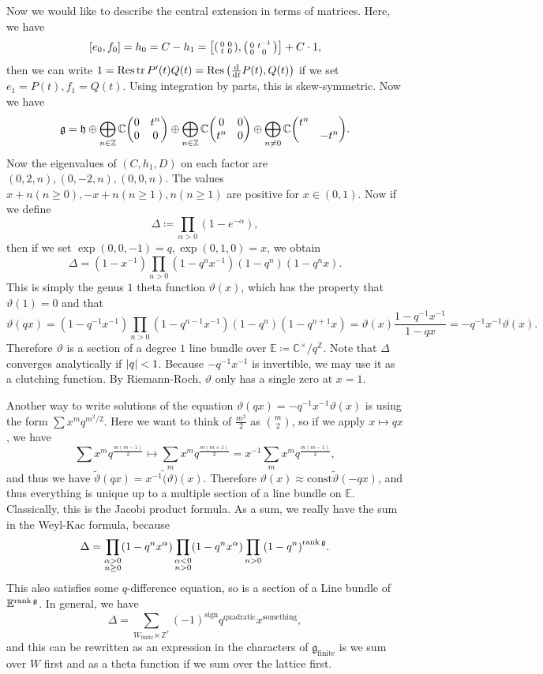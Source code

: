 \documentclass[leqno, openany]{memoir}
\theoremstyle{definition}
\theoremstyle{remark}
\theoremstyle{plain}
\theoremstyle{definition}
\theoremstyle{remark}
\newcommand{\C}{\mathbb{C}}
\newcommand{\Z}{\mathbb{Z}}
\newcommand{\E}{\mathbb{E}}
\newcommand{\mf}[1]{\mathfrak{#1}}
\newcommand{\mr}[1]{\mathrm{#1}}
\newcommand{\wtl}[1]{\widetilde{#1}}
\begin{document}
Now we would like to describe the central extension in terms of matrices. Here,
we have \[ [e_0, f_0] = h_0 = C - h_1 = \qty[ \begin{psmallmatrix} 0 & 0 \\ t &
    0 \end{psmallmatrix}, \begin{psmallmatrix} 0 & t^{-1} \\ 0 & 0
\end{psmallmatrix}] + C \cdot 1, \] then we can write $1 = \Res \tr P'(t) Q(t)
    = \Res \qty( \dv{t} P(t), Q(t) )$ if we set $e_1 = P(t), f_1 = Q(t)$. Using
    integration by parts, this is skew-symmetric. Now we have \[ \mf{g} =
    \mf{h} \oplus \bigoplus_{n \in \Z} \C \mqty(0 & t^n \\ 0 & 0) \oplus
\bigoplus_{n \in \Z} \C \mqty(0 & 0 \\ t^n & 0) \oplus \bigoplus_{n \neq 0} \C
\mqty( \dmat{t^n,-t^n} ). \] Now the eigenvalues of $(C, h_1, D)$ on each
factor are $(0, 2,n), (0, -2, n), (0, 0,n)$. The values $x+n (n \geq 0), -x+n
(n \geq 1), n (n \geq 1)$ are positive for $x \in (0,1)$. Now if we define \[
\Delta \coloneqq \prod_{\alpha > 0} (1-e^{-\alpha}), \] then if we set
$\exp(0,0,-1) = q, \exp(0,1,0) = x$, we obtain \[ \Delta = (1-x^{-1})
\prod_{n>0} (1-q^n x^{-1}) (1-q^n) (1-q^n x). \] This is simply the genus $1$
theta function $\vartheta(x)$, which has the property that $\vartheta(1) = 0$
and that \[ \vartheta(qx) = (1-q^{-1}x^{-1}) \prod_{n>0}
(1-q^{n-1}x^{-1})(1-q^n)(1-q^{n+1}x) = \vartheta(x) \frac{1-q^{-1}x^{-1}}{1-qx}
= -q^{-1}x^{-1} \vartheta(x). \] Therefore $\vartheta$ is a section of a degree
$1$ line bundle over $\E \coloneqq \C^{\times} / q^{\Z}$. Note that $\Delta$
converges analytically if $\abs{q} < 1$. Because $-q^{-1} x^{-1}$ is
invertible, we may use it as a clutching function. By Riemann-Roch, $\vartheta$
only has a single zero at $x=1$.

Another way to write solutions of the equation $\vartheta(qx) = -q^{-1}x^{-1}
\vartheta(x)$ is using the form $\sum x^m q^{m^2/2}$. Here we want to think of
$\frac{m^2}{2}$ as $\binom{m}{2}$, so if we apply $x \mapsto qx$, we have \[
\sum x^m q^{\frac{m(m-1)}{2}} \mapsto \sum_m x^m q^{\frac{m(m+1)}{2}} = x^{-1}
\sum_m x^m q^{\frac{m(m-1)}{2}}, \] and thus we have $\wtl{\vartheta}(qx) =
x^{-1} \wtl(\vartheta)(x)$. Therefore $\vartheta(x) \approx \mr{const}
\wtl{\vartheta}(-qx)$, and thus everything is unique up to a multiple section
of a line bundle on $\E$. Classically, this is the Jacobi product formula. As a
sum, we really have the sum in the Weyl-Kac formula, because \[ \Delta =
\prod_{\substack{\alpha>0 \\ n \geq 0}} (1-q^n x^{\alpha})
\prod_{\substack{\alpha<0 \\ n>0}} (1-q^n x^{\alpha}) \prod_{n > 0}
{(1-q^n)}^{\rank \mf{g}}. \] This also satisfies some $q$-difference equation,
so is a section of a Line bundle of $\E^{\rank \mf{g}}$. In general, we have \[
\Delta = \sum_{W_{\mr{finite}} \ltimes \Z^r} {(-1)}^{\mr{sign}}
q^{\text{quadratic}} x^{\text{something}}, \] and this can be rewritten as an
expression in the characters of $\mf{g}_{\text{finite}}$ is we sum over $W$
first and as a theta function if we sum over the lattice first.
\end{document}
